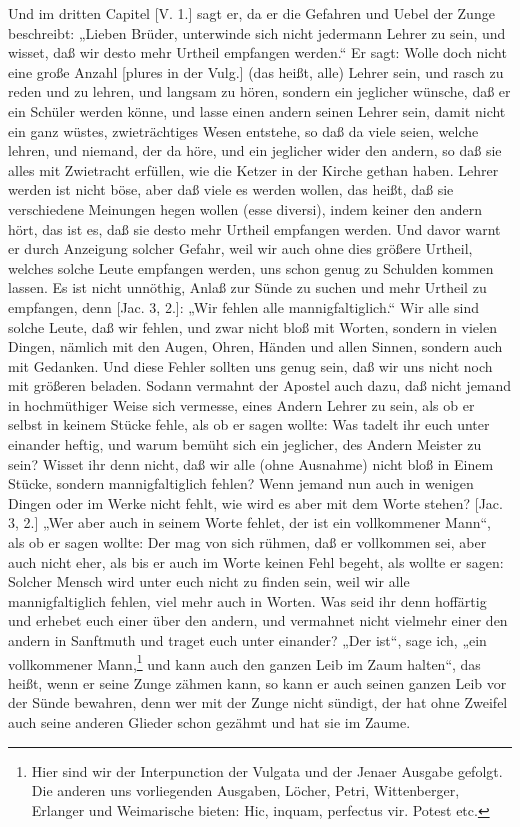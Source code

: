 Und im dritten Capitel [V. 1.] sagt er, da er die Gefahren und Uebel der Zunge beschreibt: „Lieben Brüder, unterwinde sich nicht jedermann Lehrer zu sein, und wisset, daß wir desto mehr Urtheil empfangen werden.“ Er sagt: Wolle doch nicht eine große Anzahl [plures in der Vulg.] (das heißt, alle) Lehrer sein, und rasch zu reden und zu lehren, und langsam zu hören, sondern ein jeglicher wünsche, daß er ein Schüler werden könne, und lasse einen andern seinen Lehrer sein, damit nicht ein ganz wüstes, zwieträchtiges Wesen entstehe, so daß da viele seien, welche lehren, und niemand, der da höre, und ein jeglicher wider den andern, so daß sie alles mit Zwietracht erfüllen, wie die Ketzer in der Kirche gethan haben. Lehrer werden ist nicht böse, aber daß viele es werden wollen, das heißt, daß sie verschiedene Meinungen hegen wollen (esse diversi), indem keiner den andern hört, das ist es, daß sie desto mehr Urtheil empfangen werden. Und davor warnt er durch Anzeigung solcher Gefahr, weil wir auch ohne dies größere Urtheil, welches solche Leute empfangen werden, uns schon genug zu Schulden kommen lassen. Es ist nicht unnöthig, Anlaß zur Sünde zu suchen und mehr Urtheil zu empfangen, denn [Jac. 3, 2.]: „Wir fehlen alle mannigfaltiglich.“ Wir alle sind solche Leute, daß wir fehlen, und zwar nicht bloß mit Worten, sondern in vielen Dingen, nämlich mit den Augen, Ohren, Händen und allen Sinnen, sondern auch mit Gedanken. Und diese Fehler sollten uns genug sein, daß wir uns nicht noch mit größeren beladen. Sodann vermahnt der Apostel auch dazu, daß nicht jemand in hochmüthiger Weise sich vermesse, eines Andern Lehrer zu sein, als ob er selbst in keinem Stücke fehle, als ob er sagen wollte: Was tadelt ihr euch unter einander heftig, und warum bemüht sich ein jeglicher, des Andern Meister zu sein? Wisset ihr denn nicht, daß wir alle (ohne Ausnahme) nicht bloß in Einem Stücke, sondern mannigfaltiglich fehlen? Wenn jemand nun auch in wenigen Dingen oder im Werke nicht fehlt, wie wird es aber mit dem Worte stehen? [Jac. 3, 2.] „Wer aber auch in seinem Worte fehlet, der ist ein vollkommener Mann“, als ob er sagen wollte: Der mag von sich rühmen, daß er vollkommen sei, aber auch nicht eher, als bis er auch im Worte keinen Fehl begeht, als wollte er sagen: Solcher Mensch wird unter euch nicht zu finden sein, weil wir alle mannigfaltiglich fehlen, viel mehr auch in Worten. Was seid ihr denn hoffärtig und erhebet euch einer über den andern, und vermahnet nicht vielmehr einer den andern in Sanftmuth und traget euch unter einander? „Der ist“, sage ich, „ein vollkommener Mann,\footnote{Hier sind wir der Interpunction der Vulgata und der Jenaer Ausgabe gefolgt. Die anderen uns vorliegenden Ausgaben, Löcher, Petri, Wittenberger, Erlanger und Weimarische bieten: Hic, inquam, perfectus vir. Potest etc.} und kann auch den ganzen Leib im Zaum halten“, das heißt, wenn er seine Zunge zähmen kann, so kann er auch seinen ganzen Leib vor der Sünde bewahren, denn wer mit der Zunge nicht sündigt, der hat ohne Zweifel auch seine anderen Glieder schon gezähmt und hat sie im Zaume.


